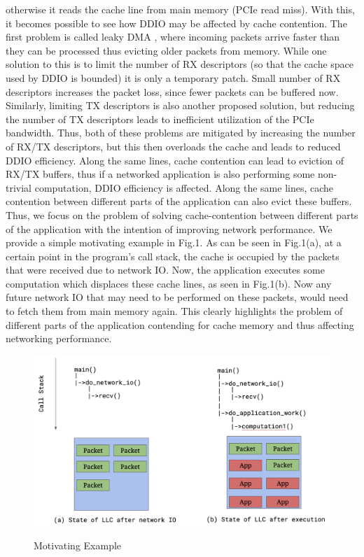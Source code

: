 \documentclass[sigconf,authorversion,noacm]{acmart}
\begin{document}
otherwise it reads the cache line from main memory (PCIe read miss). With this,
it becomes possible to see how DDIO may be affected by cache contention. The
first problem is called leaky DMA \cite{tootoonchian-resq}, where incoming
packets arrive faster than they can be processed thus evicting older packets
from memory. While one solution to this is to limit the number of RX descriptors
(so that the cache space used by DDIO is bounded) it is only a temporary patch.
Small number of RX descriptors increases the packet loss, since fewer packets
can be buffered now. Similarly, limiting TX descriptors is also another proposed
solution, but reducing the number of TX descriptors leads to inefficient
utilization of the PCIe bandwidth. Thus, both of these problems are mitigated by
increasing the number of RX/TX descriptors, but this then overloads the cache
and leads to reduced DDIO efficiency. Along the same lines, cache contention can
lead to eviction of RX/TX buffers, thus if a networked application is also
performing some non-trivial computation, DDIO efficiency is affected. Along the
same lines, cache contention between different parts of the application can also
evict these buffers. Thus, we focus on the problem of solving cache-contention
between different parts of the application with the intention of improving
network performance. We provide a simple motivating example in
Fig.1. As can be seen in Fig.1(a), at a certain point in the program's call
stack, the cache is occupied by the packets that were received due to network
IO. Now, the application executes some computation which displaces these cache
lines, as seen in Fig.1(b). Now any future network IO that may need to be
performed on these packets, would need to fetch them from main memory again.
This clearly highlights the problem of different parts of the application
contending for cache memory and thus affecting networking performance.

\begin{figure}[h]
  \centering
  \includegraphics[width=\linewidth]{motivating_example}
    \label{fig:motivating}
    \caption{Motivating Example}
\end{figure}
\end{document}
